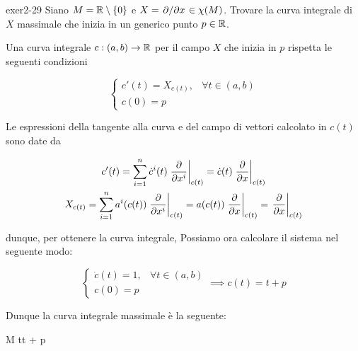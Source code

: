 {exer2-29}
{
Siano $ M = \mathbb{R} \setminus \{0\} $ e $ X = \pdv*{x} \in \chi(M) $. Trovare la curva integrale di $ X $ massimale che inizia in un generico punto $ p \in \mathbb{R} $.
}
{
Una curva integrale $ c : (a,b) \to \mathbb{R} $ per il campo $ X $ che inizia in $ p $ rispetta le seguenti condizioni

\begin{equation}
	\begin{cases}
		c'(t) = X_{c(t)}, & \forall t \in (a,b) \\
		c(0) = p
	\end{cases}
\end{equation}

Le espressioni della tangente alla curva e del campo di vettori calcolato in $ c(t) $ sono date da

\begin{gather}
	c'(t) = \sum_{i=1}^{n} \dot{c}^{i}(t) \eval{ \pdv{x^{i}} }_{c(t)} = \dot{c}(t) \eval{ \pdv{x} }_{c(t)} \\
	X_{c(t)} = \sum_{i=1}^{n} a^{i}(c(t)) \eval{ \pdv{x^{i}} }_{c(t)} = a(c(t)) \eval{ \pdv{x} }_{c(t)} = \eval{ \pdv{x} }_{c(t)}
\end{gather}

dunque, per ottenere la curva integrale, Possiamo ora calcolare il sistema nel seguente modo:

\begin{equation}
	\begin{cases}
		\dot{c}(t) = 1, & \forall t \in (a,b) \\
		c(0) = p
	\end{cases} %
	\implies %
	c(t) = t + p
\end{equation}

Dunque la curva integrale massimale è la seguente:

	{\R}{M}
	{t}{t + p}
}



